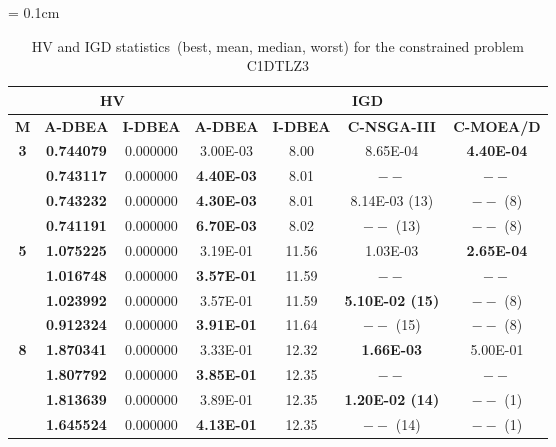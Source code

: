 \begin{table}[!htb]\scriptsize
	\centering
	\caption{HV and IGD statistics~(best, mean, median, worst) for the constrained problem C1DTLZ3}
	\label{tab:hvigdc}
	\tabcolsep = 0.1cm
	\begin{tabular}{|c|c|c|c|c|c|c|}
		\noalign{\smallskip}\hline
		\textbf{}  & \multicolumn{2}{c|}{\textbf{HV}}    & \multicolumn{4}{c|}{\textbf{IGD}}                                                \\ \hline
		\textbf{M} & \textbf{A-DBEA}   & \textbf{I-DBEA} & \textbf{A-DBEA}   & \textbf{I-DBEA} & \textbf{C-NSGA-III}    & \textbf{C-MOEA/D} \\ \hline
		\textbf{3} & \textbf{0.744079} & 0.000000        & 3.00E-03          & 8.00            & 8.65E-04               & \textbf{4.40E-04} \\
		& \textbf{0.743117} & 0.000000        & \textbf{4.40E-03} & 8.01            & $--$                   & $--$              \\
		& \textbf{0.743232} & 0.000000        & \textbf{4.30E-03} & 8.01            & 8.14E-03 (13)          & $--$ (8)          \\
		& \textbf{0.741191} & 0.000000        & \textbf{6.70E-03} & 8.02            & $--$ (13)              & $--$ (8)          \\ \hline
		\textbf{5} & \textbf{1.075225} & 0.000000        & 3.19E-01          & 11.56           & 1.03E-03               & \textbf{2.65E-04} \\
		& \textbf{1.016748} & 0.000000        & \textbf{3.57E-01} & 11.59           & $--$                   & $--$              \\
		& \textbf{1.023992} & 0.000000        & 3.57E-01          & 11.59           & \textbf{5.10E-02 (15)} & $--$ (8)          \\
		& \textbf{0.912324} & 0.000000        & \textbf{3.91E-01} & 11.64           & $--$ (15)              & $--$ (8)          \\ \hline
		\textbf{8} & \textbf{1.870341} & 0.000000        & 3.33E-01          & 12.32           & \textbf{1.66E-03}      & 5.00E-01          \\
		& \textbf{1.807792} & 0.000000        & \textbf{3.85E-01} & 12.35           & $--$                   & $--$              \\
		& \textbf{1.813639} & 0.000000        & 3.89E-01          & 12.35           & \textbf{1.20E-02 (14)} & $--$ (1)          \\
		& \textbf{1.645524} & 0.000000        & \textbf{4.13E-01} & 12.35           & $--$ (14)              & $--$ (1)          \\ \hline
	\end{tabular}
\end{table}	

